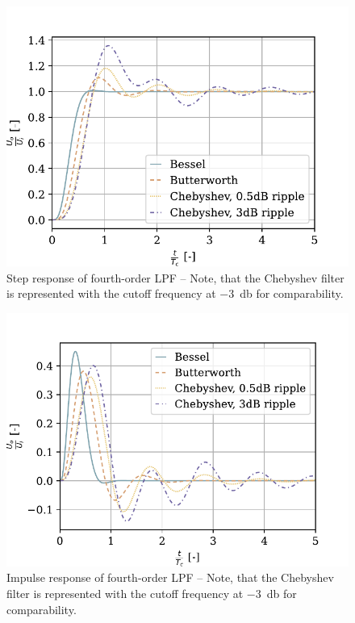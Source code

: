 \begin{figure}[!htb]
    \centering
    \includegraphics[scale=0.72]{figures/electronics/lowpass/lp_filter_4ord_step}
    \caption[Step response of fourth-order \ac{LPF}]{Step response of fourth-order \ac{LPF} -- Note, that the Chebyshev filter is represented with the cutoff frequency at \SI{-3}{\decibel} for comparability.}
    \label{fig:lp_filter_4ord_step}
\end{figure}

\begin{figure}[!htb]
    \centering
    \includegraphics[scale=0.72]{figures/electronics/lowpass/lp_filter_4ord_imp}
    \caption[Impulse response of fourth-order \ac{LPF}]{Impulse response of fourth-order \ac{LPF} -- Note, that the Chebyshev filter is represented with the cutoff frequency at \SI{-3}{\decibel} for comparability.}
    \label{fig:lp_filter_4ord_imp}
\end{figure}

